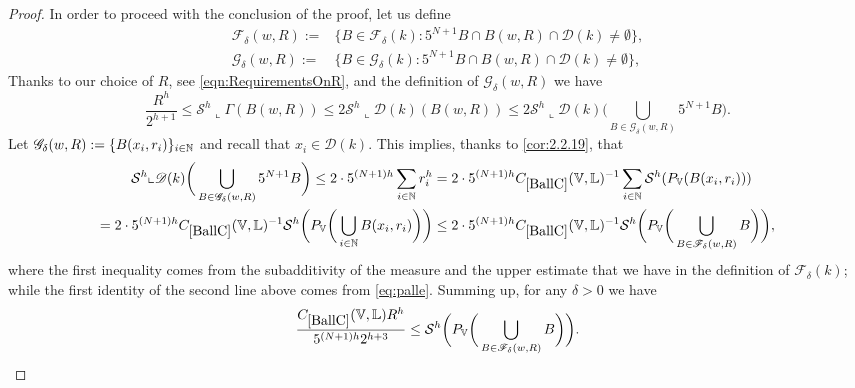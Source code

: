 \documentclass[10pt, a4paper,
oneside, headinclude,footinclude]{scrartcl}
\begin{document}
\begin{proof}
In order to proceed with the conclusion of the proof, let us define
\begin{equation}
    \begin{split}
    \mathscr{F}_\delta(w,R):=&\{B\in\mathscr{F}_\delta(k): 5^{N+1}B\cap B(w, R)\cap\mathscr{D}(k)\neq \emptyset\},\\
    \mathscr{G}_\delta(w,R):=&\{B\in\mathscr{G}_\delta(k): 5^{N+1}B\cap B(w, R)\cap\mathscr{D}(k)\neq \emptyset\},
        \nonumber
    \end{split}
\end{equation}
Thanks to our choice of $R$, see \eqref{eqn:RequirementsOnR}, and the definition of $\mathscr{G}_{\delta}(w,R)$ we have
$$\frac{R^h}{2^{h+1}}\leq \mathcal{S}^h\llcorner \Gamma(B(w,R))\leq 2\mathcal{S}^h\llcorner \mathscr{D}(k)(B(w,R))\leq2\mathcal{S}^h\llcorner \mathscr{D}(k)\bigg(\bigcup_{B\in \mathscr{G}_{\delta}(w,R)} 5^{N+1}B\bigg).$$
Let $\mathscr{G}_{\delta}(w,R):=\{B(x_i,r_i)\}_{i\in\mathbb{N}}$ and recall that $x_i\in \mathscr{D}(k)$. This implies, thanks to \cref{cor:2.2.19}, that
\begin{equation}
\begin{split}
    \mathcal{S}^h\llcorner \mathscr{D}(k)\bigg(\bigcup_{B\in \mathscr{G}_{\delta}(w,R)} 5^{N+1}B\bigg)\leq 2\cdot 5^{(N+1)h}\sum_{i\in\N}r_i^h
    &=  2\cdot 5^{(N+1)h}\oldC{BallC}(\mathbb{V},\mathbb L)^{-1}\sum_{i\in\N} \mathcal{S}^h(P_\mathbb{V}(B(x_i,r_i)))\\
    = 2\cdot 5^{(N+1)h}\oldC{BallC}(\mathbb{V},\mathbb L)^{-1}\mathcal{S}^h\bigg(P_\mathbb{V}\bigg(\bigcup_{i\in\N} B(x_i,r_i)\bigg)\bigg)&\leq 2\cdot 5^{(N+1)h}\oldC{BallC}(\mathbb{V},\mathbb L)^{-1}\mathcal{S}^h\bigg(P_\mathbb{V}\bigg(\bigcup_{B\in \mathscr{F}_\delta(w,R)} B\bigg)\bigg),
    \nonumber
    \end{split}
\end{equation}
where the first inequality comes from the subadditivity of the measure and the upper estimate that we have in the definition of $\mathscr{F}_{\delta}(k)$; while the first identity of the second line above comes from \eqref{eq:palle}. Summing up, for any $\delta>0$ we have
$$
\frac{\oldC{BallC}(\mathbb{V},\mathbb L) R^h}{ 5^{(N+1)h}2^{h+3}}\leq \mathcal{S}^h\bigg(P_\mathbb{V}\bigg(\bigcup_{B\in \mathscr{F}_\delta(w,R)} B\bigg)\bigg).
$$

\end{proof}
\end{document}
